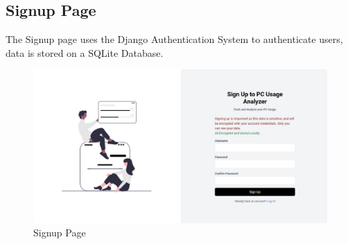 \documentclass[openany]{report}
\begin{document}
\subsection{Signup Page}
The Signup page uses the Django Authentication System to authenticate users, data is stored on a SQLite Database.\\
\begin{figure}[H]
    \centering
    \includegraphics[width=.95\textwidth]{screenshots/signup.jpg}
    \caption{Signup Page}
\end{figure}
\end{document}
